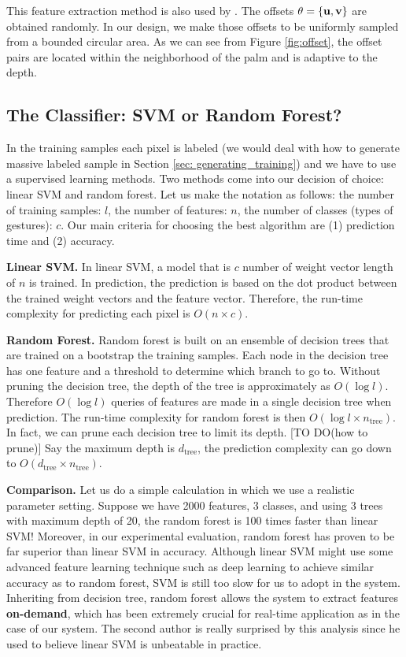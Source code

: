 This feature extraction method is also used by \cite{shotton2011}. The offsets $\theta=\{\bf{u}, \bf{v} \}$ are obtained randomly. In our design, we make those offsets to be uniformly sampled from a bounded circular area. As we can see from Figure \ref{fig:offset}, the offset pairs are located within the neighborhood of the palm and is adaptive to the depth.  

\subsection{The Classifier: SVM or Random Forest?}

In the training samples each pixel is labeled (we would deal with how to generate massive labeled sample in Section \ref{sec: generating_training}) and we have to use a supervised learning methods. Two methods come into our decision of choice: linear SVM and random forest. Let us make the notation as follows: the number of training samples: $l$, the number of features: $n$, the number of classes (types of gestures): $c$. Our main criteria for choosing the best algorithm are (1) prediction time and (2) accuracy. 

\textbf{Linear SVM.} In linear SVM, a model that is $c$ number of weight vector length of $n$ is trained. In prediction, the prediction is based on the dot product between the trained weight vectors and the feature vector. Therefore,  the run-time complexity for predicting each pixel is $O(n\times c)$.



\textbf{Random Forest.} Random forest is built on an ensemble of decision trees that are trained on a bootstrap the training samples. Each node in the decision tree has one feature and a threshold to determine which branch to go to. Without pruning the decision tree, the depth of the tree is approximately as $O(\log l)$. Therefore $O(\log l)$ queries of features are made in a single decision tree when prediction. The run-time complexity for random forest is then $O(\log l \times n_{\text{tree}})$. In fact, we can prune each decision tree to limit its depth. [TO DO(how to prune)]
Say the maximum depth is $d_{\text{tree}}$, the prediction complexity can go down to $O(d_{\text{tree}}\times n_{\text{tree}})$. 


\textbf{Comparison.} Let us do a simple calculation in which we use a realistic parameter setting. Suppose we have 2000 features, 3 classes, and using 3 trees with maximum depth of 20, the random forest is 100 times faster than linear SVM! Moreover, in our experimental evaluation, random forest has proven to be far superior than linear SVM in accuracy. Although linear SVM might use some advanced feature learning technique such as deep learning to achieve similar accuracy as to random forest, SVM is still too slow for us to adopt in the system. Inheriting from decision tree, random forest allows the system to extract features \textbf{on-demand}, which has been extremely crucial for real-time application as in the case of our system. The second author  is really surprised by this analysis since he used to believe linear SVM is unbeatable in practice.  

